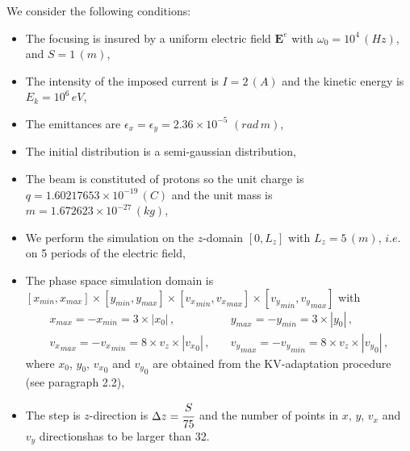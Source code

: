 \documentclass[10pt]{article}
\begin{document}
We consider the following conditions\footnotemark[3]:
\begin{itemize}
\item The focusing is insured by a uniform electric field $\mathbf{E}^{e}$ with $\omega_{0} = 10^{4}\, (Hz)$, and $S = 1 \, (m)$,
\item The intensity of the imposed current is $I = 2 \, (A)$ and the kinetic energy is $E_{k} = 10^{6}\,eV$,
\item The emittances are $\epsilon_{x} = \epsilon_{y} = 2.36 \times 10^{-5} \, \,(rad\, m)$,
\item The initial distribution is a semi-gaussian distribution,
\item The beam is constituted of protons so the unit charge is $q = 1.60217653 \times 10^{-19} \, (C)$ and the unit mass is $m = 1.672623 \times 10^{-27} \, (kg)$,
\item We perform the simulation on the $z$-domain $[0,L_{z}]$ with $L_{z} = 5\, (m)$, $\textit{i.e.}$ on 5 periods of the electric field,
\item The phase space simulation domain is $[x_{min},x_{max}] \times [y_{min},y_{max}] \times [{v_{x}}_{min},{v_{x}}_{max}] \times [{v_{y}}_{min},{v_{y}}_{max}]$ with
\begin{equation}
\begin{array}{ll}
x_{max} = -x_{min} = 3 \times |x_{0}| \, ,\quad & y_{max} = -y_{min} = 3 \times |y_{0}| \, , \\
{v_{x}}_{max} = -{v_{x}}_{min} = 8 \times v_{z}\times |{v_{x}}_{0}| \, ,\quad & {v_{y}}_{max} = -{v_{y}}_{min} = 8 \times v_{z}\times |{v_{y}}_{0}| \, ,
\end{array}
\end{equation}
where $x_{0}$, $y_{0}$, ${v_{x}}_{0}$ and ${v_{y}}_{0}$ are obtained from the KV-adaptation procedure (see paragraph 2.2),
\item The step is $z$-direction is $\Delta z = \cfrac{S}{75}$ and the number of points in $x$, $y$, $v_{x}$ and $v_{y}$ directions\footnotemark[4] has to be larger than 32.
\end{itemize}




\end{document}
